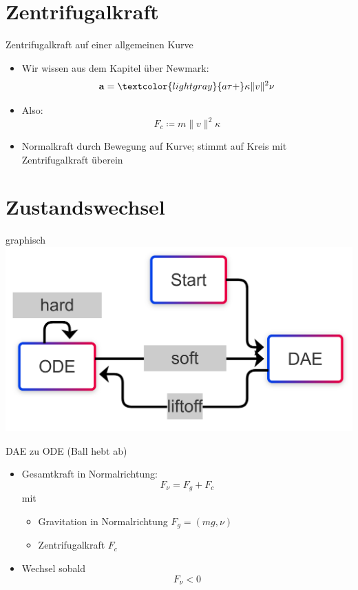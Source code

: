 \documentclass[aspectratio=169]{beamer}
\begin{document}
\section{Zentrifugalkraft}

\begin{frame}{Zentrifugalkraft auf einer allgemeinen Kurve}
\begin{itemize}
\item Wir wissen aus dem Kapitel über Newmark:
    \begin{equation*}
        \mathbf{a} = \textcolor{lightgray}{ a \tau + } \kappa \| v \|^2 \nu
    \end{equation*}
\item Also:
        \begin{equation*}
            F_c \coloneq m \| v \|^2 \kappa
        \end{equation*}
\item Normalkraft durch Bewegung auf Kurve; stimmt auf Kreis mit Zentrifugalkraft
        überein
\end{itemize}
\end{frame}

\section{Zustandswechsel}

\begin{frame}{graphisch}
	\includegraphics[scale=0.35]{./state_flowchart_2.png}
\end{frame}

\begin{frame}{DAE zu ODE (Ball hebt ab)}
\begin{itemize}
	\item Gesamtkraft in Normalrichtung:
	\[
	F_{\nu} = F_g + F_c
	\]
	mit
	\begin{itemize}
		\item Gravitation in Normalrichtung $F_g = (mg, \nu)$
		\item Zentrifugalkraft $F_c$
	\end{itemize}
	\item Wechsel sobald
	\[ 
	F_{\nu} < 0
	\]
\end{itemize}
\end{frame}
\end{document}
